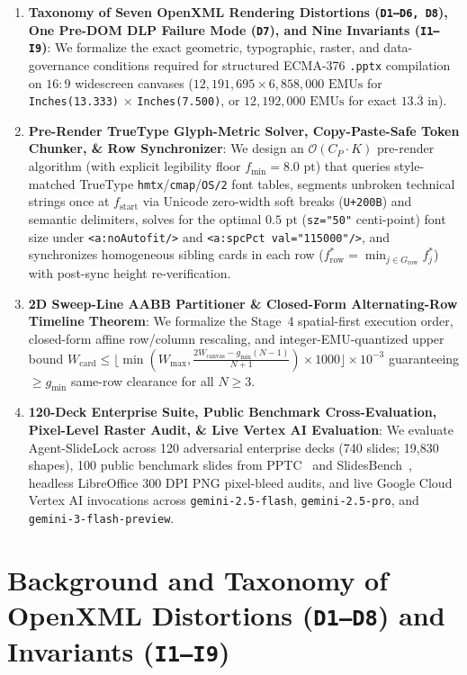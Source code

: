 \documentclass[10pt,journal,compsoc]{IEEEtran}
\begin{document}
\begin{enumerate}
    \item \textbf{Taxonomy of Seven OpenXML Rendering Distortions (\texttt{D1--D6, D8}), One Pre-DOM DLP Failure Mode (\texttt{D7}), and Nine Invariants (\texttt{I1--I9})}: We formalize the exact geometric, typographic, raster, and data-governance conditions required for structured ECMA-376 \texttt{.pptx} compilation on $16:9$ widescreen canvases ($12{,}191{,}695 \times 6{,}858{,}000\text{ EMUs}$ for \texttt{Inches(13.333)} $\times$ \texttt{Inches(7.500)}, or $12{,}192{,}000\text{ EMUs}$ for exact $13.\overline{3}\text{ in}$).
    \item \textbf{Pre-Render TrueType Glyph-Metric Solver, Copy-Paste-Safe Token Chunker, \& Row Synchronizer}: We design an $\mathcal{O}(C_P \cdot K)$ pre-render algorithm (with explicit legibility floor $f_{\min} = 8.0\text{ pt}$) that queries style-matched TrueType \texttt{hmtx}/\texttt{cmap}/\texttt{OS/2} font tables, segments unbroken technical strings once at $f_{\text{start}}$ via Unicode zero-width soft breaks (\texttt{U+200B}) and semantic delimiters, solves for the optimal $0.5\text{ pt}$ (\texttt{sz="50"} centi-point) font size under \texttt{<a:noAutofit/>} and \texttt{<a:spcPct val="115000"/>}, and synchronizes homogeneous sibling cards in each row ($f^*_{\text{row}} = \min_{j \in G_{\text{row}}} f^*_j$) with post-sync height re-verification.
    \item \textbf{2D Sweep-Line AABB Partitioner \& Closed-Form Alternating-Row Timeline Theorem}: We formalize the Stage~4 spatial-first execution order, closed-form affine row/column rescaling, and integer-EMU-quantized upper bound $W_{\text{card}} \le \lfloor\min(W_{\max}, \frac{2 W_{\text{canvas}} - g_{\min}(N - 1)}{N + 1})\times 1000\rfloor \times 10^{-3}$ guaranteeing $\ge g_{\min}$ same-row clearance for all $N \ge 3$.
    \item \textbf{120-Deck Enterprise Suite, Public Benchmark Cross-Evaluation, Pixel-Level Raster Audit, \& Live Vertex AI Evaluation}: We evaluate Agent-SlideLock across 120 adversarial enterprise decks (740 slides; 19,830 shapes), 100 public benchmark slides from PPTC~\cite{guo2024pptc} and SlidesBench~\cite{ge2025autopresent}, headless LibreOffice 300 DPI PNG pixel-bleed audits, and live Google Cloud Vertex AI invocations across \texttt{gemini-2.5-flash}, \texttt{gemini-2.5-pro}, and \texttt{gemini-3-flash-preview}.
\end{enumerate}

\section{Background and Taxonomy of OpenXML Distortions (\texttt{D1--D8}) and Invariants (\texttt{I1--I9})}
\label{sec:distortions}
\end{document}
